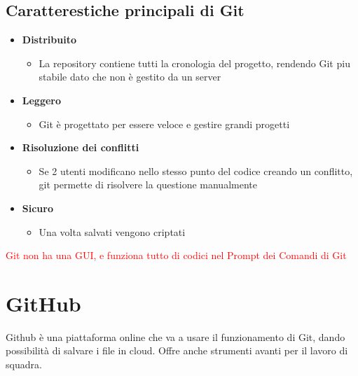 \documentclass[a4paper,12pt]{article}
\begin{document}
 \begin{center}
    \subsection *{Caratterestiche principali di Git}
 \end{center}
 \begin{itemize}
    \item \textbf{Distribuito}
    \begin{itemize}
        \item La repository contiene tutti la cronologia del progetto, rendendo Git piu stabile dato che non è gestito da un server
    \end{itemize}
        \item \textbf{Leggero}
    \begin{itemize}
        \item Git è progettato per essere veloce e gestire grandi progetti
    \end{itemize}
        \item \textbf{Risoluzione dei conflitti}
    \begin{itemize}
        \item Se 2 utenti modificano nello stesso punto del codice creando un conflitto, git permette di risolvere la questione manualmente
    \end{itemize}
        \item \textbf{Sicuro}
    \begin{itemize}
        \item Una volta salvati vengono criptati 
    \end{itemize}
 \end{itemize}

 \begin{center}
    \textcolor{red}{\tiny{Git non ha una GUI, e funziona tutto di codici nel Prompt dei Comandi di Git}}
 \end{center}

 \newpage

 \section{GitHub}
 Github è una piattaforma online che va a usare il funzionamento di Git, dando possibilità di salvare i file in cloud. 
 Offre anche strumenti avanti per il lavoro di squadra.
\end{document}
